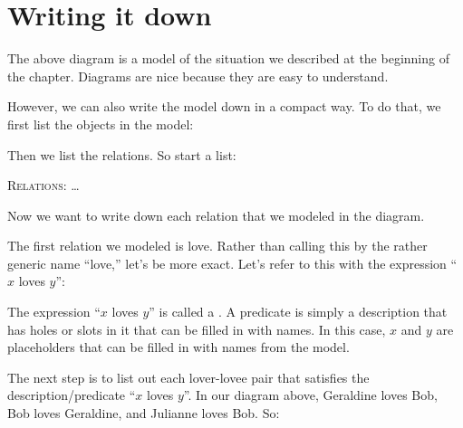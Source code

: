 \documentclass[../../../main.tex]{subfiles}
\begin{document}
\section{Writing it down}

The above diagram is a model of the situation we described at the beginning of the chapter. Diagrams are nice because they are easy to understand.

However, we can also write the model down in a compact way. To do that, we first list the objects in the model:

\begin{model}
\end{model}

\noindent
Then we list the relations. So start a list:

\begin{model}
  \item{\textsc{Relations}: \ldots}
\end{model}

\noindent
Now we want to write down each relation that we modeled in the diagram.

The first relation we modeled is love. Rather than calling this by the rather generic name ``love,'' let's be more exact. Let's refer to this with the expression ``$x$ loves $y$'':

\begin{model}
\end{model}

\noindent
The expression ``$x$ loves $y$'' is called a . A predicate is simply a description that has holes or slots in it that can be filled in with names. In this case, $x$ and $y$ are placeholders that can be filled in with names from the model. 

The next step is to list out each lover-lovee pair that satisfies the description/predicate ``$x$ loves $y$''. In our diagram above, Geraldine loves Bob, Bob loves Geraldine, and Julianne loves Bob. So:

\begin{model}
\end{model}
\end{document}
